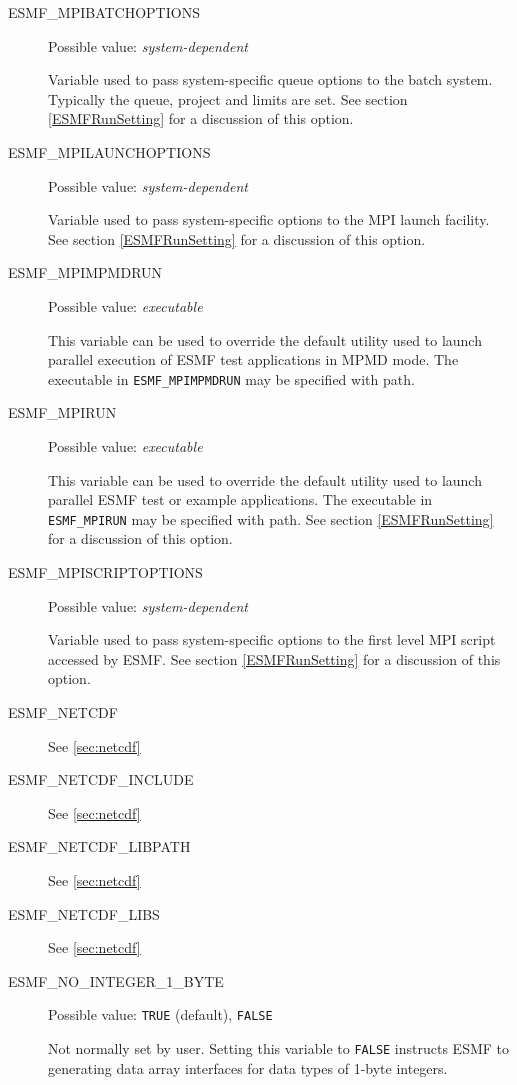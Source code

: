 \begin{description}
\item[ESMF\_MPIBATCHOPTIONS]
Possible value: {\em system-dependent}

Variable used to pass system-specific queue options to the batch system. 
Typically the queue, project and limits are set.
See section \ref{ESMFRunSetting} for a discussion of this option.

\item[ESMF\_MPILAUNCHOPTIONS]
Possible value: {\em system-dependent}

Variable used to pass system-specific options to the MPI launch facility.
See section \ref{ESMFRunSetting} for a discussion of this option.

\item[ESMF\_MPIMPMDRUN]
Possible value: {\em executable}

This variable can be used to override the default utility used to launch
parallel execution of ESMF test applications in MPMD mode. The executable in
{\tt ESMF\_MPIMPMDRUN} may be specified with path.

\item[ESMF\_MPIRUN]
Possible value: {\em executable}

This variable can be used to override the default utility used to launch
parallel ESMF test or example applications. The executable in {\tt ESMF\_MPIRUN}
may be specified with path. 
See section \ref{ESMFRunSetting} for a discussion of this option.

\item[ESMF\_MPISCRIPTOPTIONS]
Possible value: {\em system-dependent}

Variable used to pass system-specific options to the first level MPI script
accessed by ESMF.
See section \ref{ESMFRunSetting} for a discussion of this option.

\item[ESMF\_NETCDF]
See \ref{sec:netcdf}

\item[ESMF\_NETCDF\_INCLUDE]
See \ref{sec:netcdf}

\item[ESMF\_NETCDF\_LIBPATH]
See \ref{sec:netcdf}

\item[ESMF\_NETCDF\_LIBS]
See \ref{sec:netcdf}

\item[ESMF\_NO\_INTEGER\_1\_BYTE]
Possible value: {\tt TRUE} (default), {\tt FALSE}

Not normally set by user. Setting this variable to {\tt FALSE} instructs
ESMF to generating data array interfaces for data types of 1-byte integers.


\end{description}
